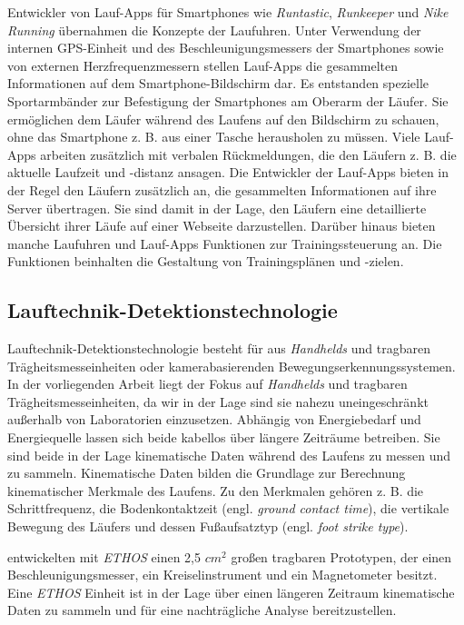 Entwickler von Lauf-Apps für Smartphones wie \emph{Runtastic}, \emph{Runkeeper} und \emph{Nike Running} übernahmen die Konzepte der Laufuhren. Unter Verwendung der internen \ac{GPS}-Einheit und des Beschleunigungsmessers der Smartphones sowie von externen Herzfrequenzmessern stellen Lauf-Apps die gesammelten Informationen auf dem Smartphone-Bildschirm dar. Es entstanden spezielle Sportarmbänder zur Befestigung der Smartphones am Oberarm der Läufer. Sie ermöglichen dem Läufer während des Laufens auf den Bildschirm zu schauen, ohne das Smartphone z. B. aus einer Tasche herausholen zu müssen. Viele Lauf-Apps arbeiten zusätzlich mit verbalen Rückmeldungen, die den Läufern z. B. die aktuelle Laufzeit und -distanz ansagen. Die Entwickler der Lauf-Apps bieten in der Regel den Läufern zusätzlich an, die gesammelten Informationen auf ihre Server übertragen. Sie sind damit in der Lage, den Läufern eine detaillierte Übersicht ihrer Läufe auf einer Webseite darzustellen. Darüber hinaus bieten manche Laufuhren und Lauf-Apps Funktionen zur Trainingssteuerung an. Die Funktionen beinhalten die Gestaltung von Trainingsplänen und -zielen.

\subsection{Lauftechnik-Detektionstechnologie}
\label{sub:lauftechnik_detektionstechnologie}
Lauftechnik-Detektionstechnologie besteht für \citet{Jensen2014} aus \emph{Handhelds} und tragbaren Trägheitsmesseinheiten oder kamerabasierenden Bewegungserkennungssystemen. In der vorliegenden Arbeit liegt der Fokus auf \emph{Handhelds} und tragbaren Trägheitsmesseinheiten, da wir in der Lage sind sie nahezu uneingeschränkt außerhalb von Laboratorien einzusetzen. Abhängig von Energiebedarf und Energiequelle lassen sich beide kabellos über längere Zeiträume betreiben. Sie sind beide in der Lage kinematische Daten während des Laufens zu messen und zu sammeln. Kinematische Daten bilden die Grundlage zur Berechnung kinematischer Merkmale des Laufens. Zu den Merkmalen gehören z. B. die Schrittfrequenz, die Bodenkontaktzeit (engl. \emph{ground contact time}), die vertikale Bewegung des Läufers und dessen Fußaufsatztyp (engl. \emph{foot strike type}).

\citet{Harms2010} entwickelten mit \emph{ETHOS} einen 2,5 $cm^{2}$ großen tragbaren Prototypen, der einen Beschleunigungsmesser, ein Kreiselinstrument und ein Magnetometer besitzt. Eine \emph{ETHOS} Einheit ist in der Lage über einen längeren Zeitraum kinematische Daten zu sammeln und für eine nachträgliche Analyse bereitzustellen.


